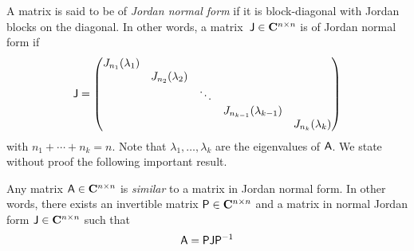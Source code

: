 A matrix is said to be of \emph{Jordan normal form} if it is block-diagonal with Jordan blocks on the diagonal.
In other words, a matrix~$\mathsf J \in \mathbf C^{n \times n}$ is of Jordan normal form if
\[
    \mathsf J =
        \begin{pmatrix}
            J_{n_1}(\lambda_1)  \\
                              & J_{n_2}(\lambda_2)    \\
                              &                 & \ddots  \\
                              &                 &         & J_{n_{k-1}}(\lambda_{k-1})   &   \\
                              &                 &         &                              & J_{n_k}(\lambda_k)
    \end{pmatrix}
\]
with $n_1 + \dotsb + n_k = n$.
Note that $\lambda_1, \dotsc, \lambda_k$ are the eigenvalues of $\mathsf A$.
We state without proof the following important result.

\begin{proposition}
    \label{proposition:matrices_jordan_normal_form}
    Any matrix $\mathsf A \in \mathbf C^{n \times n}$ is \emph{similar} to a matrix in Jordan normal form.
    In other words, there exists an invertible matrix $\mathsf P \in \mathbf C^{n \times n}$
    and a matrix in normal Jordan form $\mathsf J \in \mathbf C^{n \times n}$ such that
    \[
        \mathsf A = \mathsf P \mathsf J \mathsf P^{-1}
    \]
\end{proposition}

